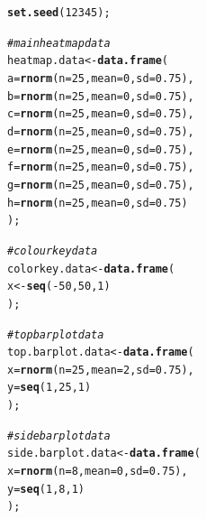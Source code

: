 \documentclass[letterpaper]{report}\usepackage[]{graphicx}\usepackage[]{color}
\makeatletter
\newcommand{\hlnum}[1]{\textcolor[rgb]{0.686,0.059,0.569}{#1}}%
\newcommand{\hlcom}[1]{\textcolor[rgb]{0.678,0.584,0.686}{\textit{#1}}}%
\newcommand{\hlopt}[1]{\textcolor[rgb]{0,0,0}{#1}}%
\newcommand{\hlstd}[1]{\textcolor[rgb]{0.345,0.345,0.345}{#1}}%
\newcommand{\hlkwb}[1]{\textcolor[rgb]{0.69,0.353,0.396}{#1}}%
\newcommand{\hlkwc}[1]{\textcolor[rgb]{0.333,0.667,0.333}{#1}}%
\newcommand{\hlkwd}[1]{\textcolor[rgb]{0.737,0.353,0.396}{\textbf{#1}}}%
\newenvironment{kframe}{%
 \def\at@end@of@kframe{}%
 \ifinner\ifhmode%
  \def\at@end@of@kframe{\end{minipage}}%
  \begin{minipage}{\columnwidth}%
 \fi\fi%
 \def\FrameCommand##1{\hskip\@totalleftmargin \hskip-\fboxsep
 \colorbox{shadecolor}{##1}\hskip-\fboxsep
     \hskip-\linewidth \hskip-\@totalleftmargin \hskip\columnwidth}%
 \MakeFramed {\advance\hsize-\width
   \@totalleftmargin\z@ \linewidth\hsize
   \@setminipage}}%
 {\par\unskip\endMakeFramed%
 \at@end@of@kframe}
\newenvironment{knitrout}{}{} %
\makeatother
\begin{document}
\begin{knitrout}
\color{fgcolor}\begin{kframe}
\begin{alltt}
\hlkwd{set.seed}\hlstd{(}\hlnum{12345}\hlstd{);}

\hlcom{# main heatmap data}
\hlstd{heatmap.data} \hlkwb{<-} \hlkwd{data.frame}\hlstd{(}
    \hlkwc{a} \hlstd{=} \hlkwd{rnorm}\hlstd{(}\hlkwc{n} \hlstd{=} \hlnum{25}\hlstd{,} \hlkwc{mean} \hlstd{=} \hlnum{0}\hlstd{,} \hlkwc{sd} \hlstd{=} \hlnum{0.75}\hlstd{),}
    \hlkwc{b} \hlstd{=} \hlkwd{rnorm}\hlstd{(}\hlkwc{n} \hlstd{=} \hlnum{25}\hlstd{,} \hlkwc{mean} \hlstd{=} \hlnum{0}\hlstd{,} \hlkwc{sd} \hlstd{=} \hlnum{0.75}\hlstd{),}
    \hlkwc{c} \hlstd{=} \hlkwd{rnorm}\hlstd{(}\hlkwc{n} \hlstd{=} \hlnum{25}\hlstd{,} \hlkwc{mean} \hlstd{=} \hlnum{0}\hlstd{,} \hlkwc{sd} \hlstd{=} \hlnum{0.75}\hlstd{),}
    \hlkwc{d} \hlstd{=} \hlkwd{rnorm}\hlstd{(}\hlkwc{n} \hlstd{=} \hlnum{25}\hlstd{,} \hlkwc{mean} \hlstd{=} \hlnum{0}\hlstd{,} \hlkwc{sd} \hlstd{=} \hlnum{0.75}\hlstd{),}
    \hlkwc{e} \hlstd{=} \hlkwd{rnorm}\hlstd{(}\hlkwc{n} \hlstd{=} \hlnum{25}\hlstd{,} \hlkwc{mean} \hlstd{=} \hlnum{0}\hlstd{,} \hlkwc{sd} \hlstd{=} \hlnum{0.75}\hlstd{),}
    \hlkwc{f} \hlstd{=} \hlkwd{rnorm}\hlstd{(}\hlkwc{n} \hlstd{=} \hlnum{25}\hlstd{,} \hlkwc{mean} \hlstd{=} \hlnum{0}\hlstd{,} \hlkwc{sd} \hlstd{=} \hlnum{0.75}\hlstd{),}
    \hlkwc{g} \hlstd{=} \hlkwd{rnorm}\hlstd{(}\hlkwc{n} \hlstd{=} \hlnum{25}\hlstd{,} \hlkwc{mean} \hlstd{=} \hlnum{0}\hlstd{,} \hlkwc{sd} \hlstd{=} \hlnum{0.75}\hlstd{),}
    \hlkwc{h} \hlstd{=} \hlkwd{rnorm}\hlstd{(}\hlkwc{n} \hlstd{=} \hlnum{25}\hlstd{,} \hlkwc{mean} \hlstd{=} \hlnum{0}\hlstd{,} \hlkwc{sd} \hlstd{=} \hlnum{0.75}\hlstd{)}
    \hlstd{);}

\hlcom{# colourkey data}
\hlstd{colorkey.data} \hlkwb{<-} \hlkwd{data.frame}\hlstd{(}
    \hlstd{x} \hlkwb{<-} \hlkwd{seq}\hlstd{(}\hlopt{-}\hlnum{50}\hlstd{,}\hlnum{50}\hlstd{,}\hlnum{1}\hlstd{)}
    \hlstd{);}

\hlcom{# top barplot data}
\hlstd{top.barplot.data} \hlkwb{<-} \hlkwd{data.frame}\hlstd{(}
    \hlkwc{x} \hlstd{=} \hlkwd{rnorm}\hlstd{(}\hlkwc{n} \hlstd{=} \hlnum{25}\hlstd{,} \hlkwc{mean} \hlstd{=} \hlnum{2}\hlstd{,} \hlkwc{sd} \hlstd{=} \hlnum{0.75}\hlstd{),}
    \hlkwc{y} \hlstd{=} \hlkwd{seq}\hlstd{(}\hlnum{1}\hlstd{,}\hlnum{25}\hlstd{,}\hlnum{1}\hlstd{)}
    \hlstd{);}

 \hlcom{# side barplot data}
\hlstd{side.barplot.data} \hlkwb{<-} \hlkwd{data.frame}\hlstd{(}
    \hlkwc{x} \hlstd{=} \hlkwd{rnorm}\hlstd{(}\hlkwc{n} \hlstd{=} \hlnum{8}\hlstd{,} \hlkwc{mean} \hlstd{=} \hlnum{0}\hlstd{,} \hlkwc{sd} \hlstd{=} \hlnum{0.75}\hlstd{),}
    \hlkwc{y} \hlstd{=} \hlkwd{seq}\hlstd{(}\hlnum{1}\hlstd{,}\hlnum{8}\hlstd{,}\hlnum{1}\hlstd{)}
    \hlstd{);}
\end{alltt}
\end{kframe}
\end{knitrout}
\end{document}
